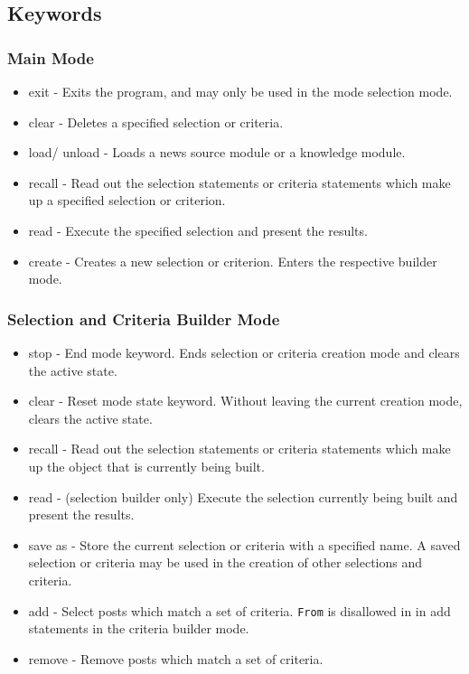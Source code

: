 \subsection{Keywords}
\label{sub:DerpOperators}

\subsubsection{Main Mode}
\begin{itemize}
\item exit - Exits the program, and may only be used in the mode selection mode.
\item clear - Deletes a specified selection or criteria.
\item load/ unload - Loads a news source module or a knowledge module.
\item recall - Read out the selection statements or criteria statements which make up a specified selection or criterion.
\item read - Execute the specified selection and present the results.
\item create - Creates a new selection or criterion. Enters the respective builder mode.
\end{itemize}

\subsubsection{Selection and Criteria Builder Mode}
\begin{itemize}
\item stop - End mode keyword. Ends selection or criteria creation mode and clears the active state.
\item clear - Reset mode state keyword. Without leaving the current creation mode, clears the active state.
\item recall - Read out the selection statements or criteria statements which make up the object that is currently being built.
\item read - (selection builder only) Execute the selection currently being built and present the results.
\item save as - Store the current selection or criteria with a specified name. A saved selection or criteria may be used in the creation of other selections and criteria.
\item add - Select posts which match a set of criteria. \texttt{From} is disallowed in in add statements in the criteria builder mode.
\item remove - Remove posts which match a set of criteria.
\end{itemize}
